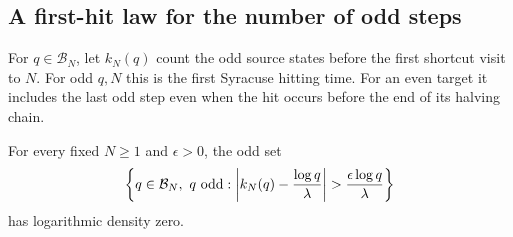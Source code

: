 \subsection{A first-hit law for the number of odd steps}

For \(q\in\mathcal B_N\), let \(k_N(q)\) count the odd source
states before the first shortcut visit to \(N\). For odd \(q,N\)
this is the first Syracuse hitting time. For an even target it
includes the last odd step even when the hit occurs before the end
of its halving chain.

\begin{proposition}\label{prop:ct-time-law}
For every fixed \(N\ge1\) and \(\epsilon>0\), the odd set
\begin{equation}\label{eq:ct-time-exception}
 \left\{q\in\mathcal B_N,\ q\ {\rm odd}:
   \left|k_N(q)-\frac{\log q}{\lambda}\right|
                      >\frac{\epsilon\log q}{\lambda}\right\}
\end{equation}
has logarithmic density zero.
\end{proposition}
